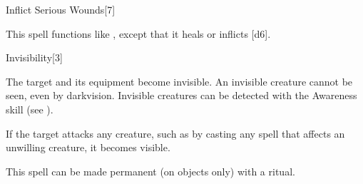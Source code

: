 \begin{spellsection}[Mass]{Inflict Serious Wounds}[7]
    \begin{spellheader}
    \end{spellheader}
    \begin{spellcontent}
        \begin{spelltargetinginfo}
        \end{spelltargetinginfo}
        \begin{spelleffects}
            \spellspecial This spell functions like , except that it heals or inflicts [d6].
        \end{spelleffects}
    \end{spellcontent}
    \begin{spellfooter}
        \miscastexplode
    \end{spellfooter}
\end{spellsection}

\begin{spellsection}{Invisibility}[3]
    \begin{spellheader}
    \end{spellheader}
    \begin{spellcontent}
        \begin{spelltargetinginfo}
        \end{spelltargetinginfo}
        \begin{spelleffects}
            \spelleffect The target and its equipment become invisible. An invisible creature cannot be seen, even by darkvision. Invisible creatures can be detected with the Awareness skill (see ).

            If the target attacks any creature, such as by casting any spell that affects an unwilling creature, it becomes visible.
            \spelldur \durshort \dismissable
        \end{spelleffects}
    \end{spellcontent}
    \begin{spellfooter}
        \spellnotes This spell can be made permanent (on objects only) with a  ritual.
        \miscastrandom
    \end{spellfooter}
\end{spellsection}

